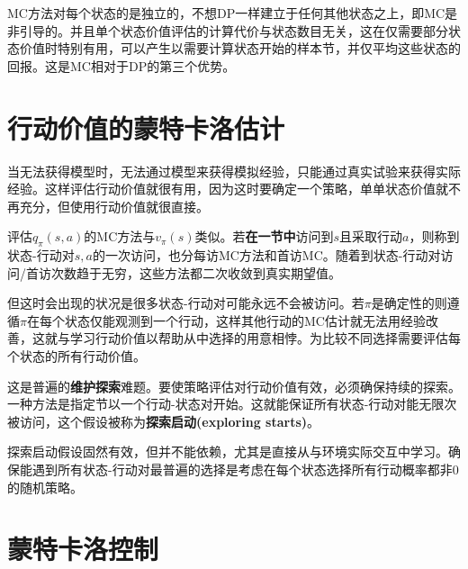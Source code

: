 \documentclass{ctexart}
\begin{document}
MC方法对每个状态的是独立的，不想DP一样建立于任何其他状态之上，即MC是非引导的。并且单个状态价值评估的计算代价与状态数目无关，这在仅需要部分状态价值时特别有用，可以产生以需要计算状态开始的样本节，并仅平均这些状态的回报。这是MC相对于DP的第三个优势。



\section{行动价值的蒙特卡洛估计}

当无法获得模型时，无法通过模型来获得模拟经验，只能通过真实试验来获得实际经验。这样评估行动价值就很有用，因为这时要确定一个策略，单单状态价值就不再充分，但使用行动价值就很直接。

评估$q_\pi(s,a)$的MC方法与$v_\pi(s)$类似。若\textbf{在一节中}访问到$s$且采取行动$a$，则称到状态-行动对$s,a$的一次访问，也分每访MC方法和首访MC。随着到状态-行动对访问/首访次数趋于无穷，这些方法都二次收敛到真实期望值。

但这时会出现的状况是很多状态-行动对可能永远不会被访问。若$\pi$是确定性的则遵循$\pi$在每个状态仅能观测到一个行动，这样其他行动的MC估计就无法用经验改善，这就与学习行动价值以帮助从中选择的用意相悖。为比较不同选择需要评估每个状态的所有行动价值。

这是普遍的\textbf{维护探索}难题。要使策略评估对行动价值有效，必须确保持续的探索。一种方法是指定节以一个行动-状态对开始。这就能保证所有状态-行动对能无限次被访问，这个假设被称为\textbf{探索启动(exploring starts)}。

探索启动假设固然有效，但并不能依赖，尤其是直接从与环境实际交互中学习。确保能遇到所有状态-行动对最普遍的选择是考虑在每个状态选择所有行动概率都非0的随机策略。



\section{蒙特卡洛控制}
\end{document}
